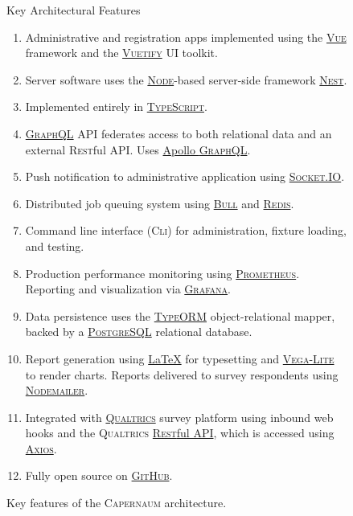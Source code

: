 \documentclass{article}
\newcommand{\axios}{\textsc{Axios}}
\newcommand{\bull}{\textsc{Bull}}
\newcommand{\caper}{\textsc{Capernaum}}
\newcommand{\cli}{\textsc{Cli}}
\newcommand{\gh}{\textsc{GitHub}}
\newcommand{\gql}{\textsc{GraphQL}}
\newcommand{\grafana}{\textsc{Grafana}}
\newcommand{\nest}{\textsc{Nest}}
\newcommand{\nodemailer}{\textsc{Node\-mailer}}
\newcommand{\node}{\textsc{Node}}
\newcommand{\pg}{\textsc{PostgreSQL}}
\newcommand{\prometheus}{\textsc{Prometheus}}
\newcommand{\redis}{\textsc{Redis}}
\newcommand{\rest}{\textsc{Rest}ful}
\newcommand{\sio}{\textsc{Socket.IO}}
\newcommand{\ts}{\textsc{TypeScript}}
\newcommand{\typeorm}{\textsc{TypeORM}}
\newcommand{\vega}{\textsc{Vega-Lite}}
\newcommand{\vuetify}{\textsc{Vuetify}}
\newcommand{\vue}{\textsc{Vue}}
\newcommand{\qual}{\textsc{Qualtrics}}
\begin{document}
\begin{figure}
  \centering
  \begin{cbox}{Key Architectural Features}
    \begin{enumerate}
    \item Administrative and registration apps implemented using
      the \href{https://vuejs.org/}{\vue{}} framework and
      the \href{https://vuetifyjs.com/}{\vuetify} UI toolkit.
    \item Server software uses
      the \href{https://nodejs.org/}{\node}-based
      server-side framework
      \href{https://nestjs.com/}{\nest}.
    \item Implemented entirely in \href{https://www.typescriptlang.org/}{\ts}.
    \item \href{https://graphql.org/}{\gql{}} API
      federates access to both relational data and an external \rest{} API.
      Uses \href{https://www.apollographql.com/}{Apollo \gql}.
    \item Push notification to administrative application
      using \href{https://socket.io/}{\sio}.
    \item Distributed job queuing system
      using \href{https://www.npmjs.com/package/bull}{\bull}
      and \href{https://redis.io/}{\redis}.
    \item Command line interface (\cli) for administration, fixture loading, and testing.
    \item Production performance monitoring using \href{https://prometheus.io/}{\prometheus}.
      Reporting and visualization via \href{https://grafana.com/grafana/}{\grafana}.
    \item Data persistence uses the
      \href{https://typeorm.io/}{\typeorm} object-relational mapper,
      backed by a 
      \href{https://www.postgresql.org/}{\pg{}} relational database.
    \item Report generation using \href{https://www.latex-project.org/}{\LaTeX} for typesetting
      and \href{https://vega.github.io/vega-lite/}{\vega} to render charts.
      Reports delivered to survey respondents using \href{https://nodemailer.com/}{\nodemailer}.
    \item Integrated with
      \href{https://www.qualtrics.com/}{\qual} survey platform
      using inbound web hooks and the \qual{}
      \href{https://api.qualtrics.com/}{\rest{} API},
      which is accessed using \href{https://axios-http.com/}{\axios}.
    \item Fully open source on \href{https://github.com/quantum-bits/capernaum.git}{\gh}.
    \end{enumerate}
  \end{cbox}
  \caption{Key features of the \caper{} architecture.}
  \label{fig:features}
\end{figure}
\end{document}
